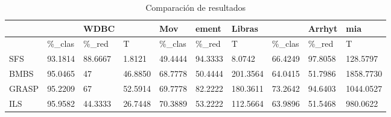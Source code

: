 \begin{table}[H]
	\centering
	\begin{tabular}{l|lll|lll|lll}
				& 			& WDBC 		&			&	  Mov	& ement 	& Libras	&			& Arrhyt	& mia		\\ \hline
				& \%\_clas	& \%\_red	& T			& \%\_clas	& \%\_red	& T			& \%\_clas	& \%\_red	& T			\\ \hline
		SFS		& 93.1814	& 88.6667	& 1.8121	& 49.4444	& 94.3333	& 8.0742	& 66.4249	& 97.8058	& 128.5797 	\\ \hline
		BMBS	& 95.0465	& 47		& 46.8850	& 68.7778	& 50.4444	& 201.3564	& 64.0415	& 51.7986	& 1858.7730	\\ \hline
		GRASP	& 95.2209	& 67		& 52.5914	& 69.7778	& 82.2222	& 180.3611	& 73.2642	& 94.6403	& 1044.0527	\\ \hline
		ILS		& 95.9582	& 44.3333	& 26.7448	& 70.3889	& 53.2222	& 112.5664	& 63.9896	& 51.5468	& 980.0622
		
	\end{tabular}
	\caption{Comparación de resultados}
	\label{Compare}
\end{table}